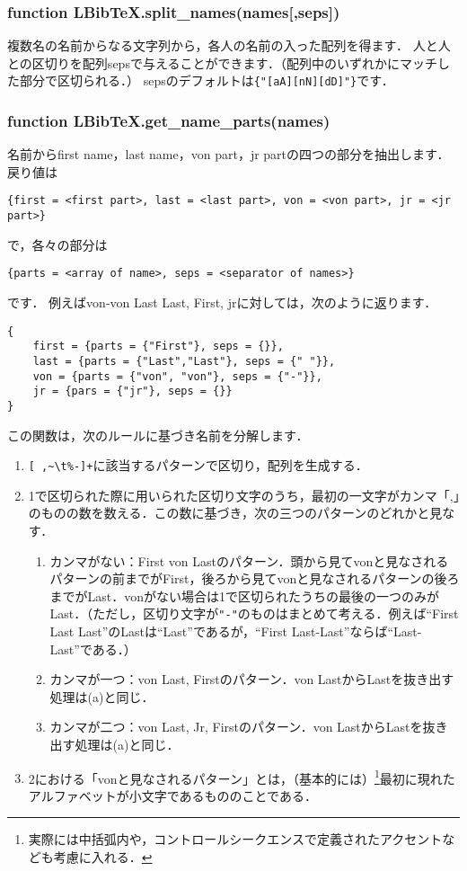 \documentclass[dvipdfmx,a4paper]{jsarticle}
\begin{document}
\subsubsection{function LBibTeX.split\_names(names[,seps])}
複数名の名前からなる文字列から，各人の名前の入った配列を得ます．
人と人との区切りを配列sepsで与えることができます．（配列中のいずれかにマッチした部分で区切られる．）
sepsのデフォルトは\verb|{"[aA][nN][dD]"}|です．

\subsubsection{function LBibTeX.get\_name\_parts(names)}
名前からfirst name，last name，von part，jr partの四つの部分を抽出します．
戻り値は
\begin{lstlisting}
{first = <first part>, last = <last part>, von = <von part>, jr = <jr part>}
\end{lstlisting}
で，各々の部分は
\begin{lstlisting}
{parts = <array of name>, seps = <separator of names>}
\end{lstlisting}
です．%
例えばvon-von Last Last, First, jrに対しては，次のように返ります．
\begin{lstlisting}
{
	first = {parts = {"First"}, seps = {}},
	last = {parts = {"Last","Last"}, seps = {" "}},
	von = {parts = {"von", "von"}, seps = {"-"}},
	jr = {pars = {"jr"}, seps = {}}
}
\end{lstlisting}

この関数は，次のルールに基づき名前を分解します．
\begin{enumerate}
\item \verb|[ ,~\t%-]+|に該当するパターンで区切り，配列を生成する．
\item 1で区切られた際に用いられた区切り文字のうち，最初の一文字がカンマ「,」のものの数を数える．この数に基づき，次の三つのパターンのどれかと見なす．
\begin{enumerate}
\item カンマがない：First von Lastのパターン．頭から見てvonと見なされるパターンの前までがFirst，後ろから見てvonと見なされるパターンの後ろまでがLast．vonがない場合は1で区切られたうちの最後の一つのみがLast．（ただし，区切り文字が\verb|"-"|のものはまとめて考える．例えば``First Last Last''のLastは``Last''であるが，``First Last-Last''ならば``Last-Last''である．）
\item カンマが一つ：von Last, Firstのパターン．von LastからLastを抜き出す処理は(a)と同じ．
\item カンマが二つ：von Last, Jr, Firstのパターン．von LastからLastを抜き出す処理は(a)と同じ．
\end{enumerate}
\item 2における「vonと見なされるパターン」とは，（基本的には）\footnote{実際には中括弧内や，コントロールシークエンスで定義されたアクセントなども考慮に入れる．}最初に現れたアルファベットが小文字であるもののことである．
\end{enumerate}
\end{document}
